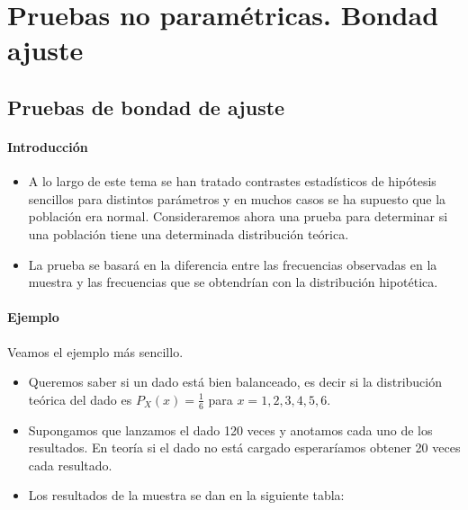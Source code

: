 



\chapter{Pruebas no paramétricas. Bondad ajuste}


\section{Pruebas de bondad de ajuste}

\begin{frame}
\frametitle{Introducción}
\begin{itemize}
\item A lo largo de este tema se han tratado contrastes estadísticos de hipótesis sencillos para distintos parámetros y en muchos casos se ha supuesto que la población era normal. Consideraremos ahora una prueba para determinar si una población tiene una determinada distribución teórica.
\item La prueba se basará en la diferencia entre las frecuencias observadas en la muestra y las frecuencias que se obtendrían
con la distribución hipotética.
\end{itemize}
\end{frame}

\begin{frame}
\frametitle{Ejemplo}
Veamos el ejemplo más sencillo.
\begin{itemize}
\item  Queremos saber si un dado está  bien balanceado, es decir si la distribución teórica del dado es $P_{X}(x)=\frac{1}{6}$ para $x=1,2,3,4,5,6$.
\item Supongamos que lanzamos el dado 120 veces y anotamos cada uno de los resultados. En teoría si el dado no está cargado esperaríamos obtener 20 veces cada resultado.
\item  Los resultados de la muestra se dan en la siguiente tabla:
\end{itemize}
\end{frame}


